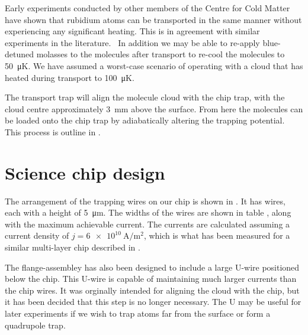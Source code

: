 Early experiments conducted by other members of the Centre for Cold Matter have
shown that rubidium atoms can be transported in the same manner without
experiencing any significant heating. This is in agreement with similar
experiments in the literature.~\cite{} In addition we may be able to re-apply
blue-detuned molasses to the molecules after transport to re-cool the molecules
to \SI{50}{\micro\kelvin}. We have assumed a worst-case scenario of operating
with a cloud that has heated during transport to \SI{100}{\micro\kelvin}.


The transport trap will align the molecule cloud with the chip trap, with the
cloud centre approximately \SI{3}{\milli\meter} above the surface. From here
the molecules can be loaded onto the chip trap by adiabatically altering the
trapping potential. This process is outline in . 

\section{Science chip design}


The arrangement of the trapping wires on our chip is shown in
. It has  wires, each with a height
of \SI{5}{\micro\meter}. The widths of the wires are shown in table
, along with the maximum achievable current. The
currents are calculated assuming a current density of
$j=\SI{6e10}{\ampere\per\meter\squared}$, which is what has been measured for a
similar multi-layer chip described in .

\begin{figure}[h]
\vspace{0.8cm}
\centering
  \caption{}
  \label{design:fig:chip}
\end{figure}

The flange-assembley  has also been designed to include a
large U-wire positioned below the chip. This U-wire is capable of maintaining
much larger currents than the chip wires. It was orginally intended for
aligning the cloud with the chip, but it has been decided that this step is no
longer necessary. The U may be useful for later experiments if we wish to trap
atoms far from the surface or form a quadrupole trap.

